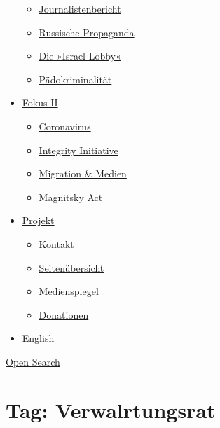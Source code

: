 \begin{itemize}
  \begin{itemize}
  \tightlist
  \item
    \href{https://swprs.org/bericht-eines-journalisten/}{Journalistenbericht}
  \item
    \href{https://swprs.org/russische-propaganda/}{Russische Propaganda}
  \item
    \href{https://swprs.org/die-israel-lobby-fakten-und-mythen/}{Die
    »Israel-Lobby«}
  \item
    \href{https://swprs.org/geopolitik-und-paedokriminalitaet/}{Pädokriminalität}
  \end{itemize}
\item
  \href{https://swprs.org/migration-und-medien/}{Fokus II}

  \begin{itemize}
  \tightlist
  \item
    \href{https://swprs.org/covid-19-hinweis-ii/}{Coronavirus}
  \item
    \href{https://swprs.org/die-integrity-initiative/}{Integrity
    Initiative}
  \item
    \href{https://swprs.org/migration-und-medien/}{Migration \& Medien}
  \item
    \href{https://swprs.org/der-fall-magnitsky/}{Magnitsky Act}
  \end{itemize}
\item
  \href{https://swprs.org/kontakt/}{Projekt}

  \begin{itemize}
  \tightlist
  \item
    \href{https://swprs.org/kontakt/}{Kontakt}
  \item
    \href{https://swprs.org/uebersicht/}{Seitenübersicht}
  \item
    \href{https://swprs.org/medienspiegel/}{Medienspiegel}
  \item
    \href{https://swprs.org/donationen/}{Donationen}
  \end{itemize}
\item
  \href{https://swprs.org/contact/}{English}
\end{itemize}

\protect\hyperlink{}{Open Search}

\hypertarget{tag-verwalrtungsrat}{%
\section{Tag: Verwalrtungsrat}\label{tag-verwalrtungsrat}}

